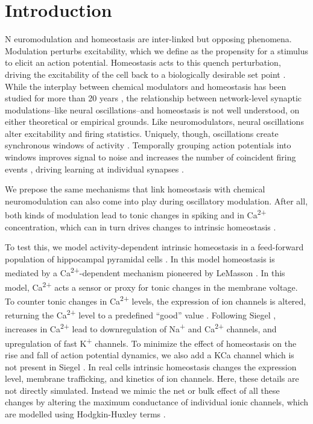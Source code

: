 \documentclass{article}
\begin{document}
\section*{Introduction}
\lettrine[loversize=0,nindent=0,realheight=true]{N}{} euromodulation and homeostasis are inter-linked but opposing phenomena. Modulation perturbs excitability, which we define as the propensity for a stimulus to elicit an action potential. Homeostasis acts to this quench perturbation, driving the excitability of the cell back to a biologically desirable set point \cite{LeMasson1993,Abbott1993}. While the interplay between chemical modulators and homeostasis has been studied for more than 20 years \cite{LeMasson1993,Abbott1993,Golowasch1999,Marder2014,Marder2015,Gutierrez2013}, the relationship between network-level synaptic modulations--like neural oscillations--and homeostasis is not well understood, on either theoretical or empirical grounds. Like neuromodulators, neural oscillations alter excitability and firing statistics. Uniquely, though, oscillations create synchronous windows of activity \cite{Lisman2013,Voytek2015}. Temporally grouping action potentials into windows improves signal to noise and increases the number of coincident firing events \cite{Chen2013,Zhou2015,Voytek2015a,Peterson2017}, driving learning at individual synapses \cite{Muller2011,Song2000,Markram1997}. 

We prepose the same mechanisms that link homeostasis with chemical neuromodulation can also come into play during oscillatory modulation. After all, both kinds of modulation lead to tonic changes in spiking and in Ca\textsuperscript{2+} concentration, which can in turn drives changes to intrinsic homeostasis \cite{Liu1998}. 

To test this, we model activity-dependent intrinsic homeostasis in a feed-forward population of hippocampal pyramidal cells \cite{Siegel1994}. In this model homeostasis is mediated by a Ca\textsuperscript{2+}-dependent mechanism \cite{Golowasch1999,Marder2014,Marder2015,Gutierrez2013,OLeary2014} pioneered by LeMasson \cite{LeMasson1993,Abbott1993}. In this model, Ca\textsuperscript{2+} acts a sensor or proxy for tonic changes in the membrane voltage. To counter tonic changes in Ca\textsuperscript{2+} levels, the expression of ion channels is altered, returning the Ca\textsuperscript{2+} level to a predefined ``good'' value \cite{Golowasch1999,OLeary2013}. Following Siegel \cite{Siegel1994}, increases in Ca\textsuperscript{2+} lead to downregulation of Na\textsuperscript{+} and Ca\textsuperscript{2+} channels, and upregulation of fast K\textsuperscript{+} channels. To minimize the effect of homeostasis on the rise and fall of action potential dynamics, we also add a KCa channel which is not present in Siegel \citep{Siegel1994}. In real cells intrinsic homeostasis changes the expression level, membrane trafficking, and kinetics of ion channels. Here, these details are not directly simulated. Instead we mimic the net or bulk effect of all these changes by altering the maximum conductance of individual ionic channels, which are modelled using Hodgkin-Huxley terms \cite{LeMasson1993,OLeary2013,OLeary2014}.
\end{document}
